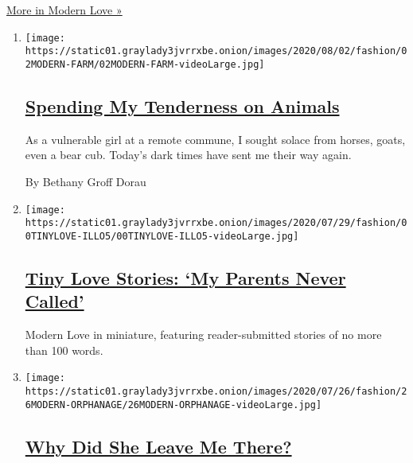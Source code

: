 \href{/column/modern-love}{More in Modern Love »}

\begin{enumerate}
\def\labelenumi{\arabic{enumi}.}
\item
  \texttt{[image: https://static01.graylady3jvrrxbe.onion/images/2020/08/02/fashion/02MODERN-FARM/02MODERN-FARM-videoLarge.jpg]}

  \hypertarget{spending-my-tenderness-on-animals}{%
  \subsection{\texorpdfstring{\href{/2020/07/31/style/modern-love-spending-tenderness-on-animals.html}{Spending
  My Tenderness on
  Animals}}{Spending My Tenderness on Animals}}\label{spending-my-tenderness-on-animals}}

  As a vulnerable girl at a remote commune, I sought solace from horses,
  goats, even a bear cub. Today's dark times have sent me their way
  again.

  By Bethany Groff Dorau
\item
  \texttt{[image: https://static01.graylady3jvrrxbe.onion/images/2020/07/29/fashion/00TINYLOVE-ILLO5/00TINYLOVE-ILLO5-videoLarge.jpg]}

  \hypertarget{tiny-love-stories-my-parents-never-called}{%
  \subsection{\texorpdfstring{\href{/2020/07/28/style/tiny-modern-love-stories-coronavirus-my-parents-never-called.html}{Tiny
  Love Stories: `My Parents Never
  Called'}}{Tiny Love Stories: `My Parents Never Called'}}\label{tiny-love-stories-my-parents-never-called}}

  Modern Love in miniature, featuring reader-submitted stories of no
  more than 100 words.
\item
  \texttt{[image: https://static01.graylady3jvrrxbe.onion/images/2020/07/26/fashion/26MODERN-ORPHANAGE/26MODERN-ORPHANAGE-videoLarge.jpg]}

  \hypertarget{why-did-she-leave-me-there}{%
  \subsection{\texorpdfstring{\href{/2020/07/24/style/modern-love-adoption-vietnam-why-did-she-leave-me-there.html}{Why
  Did She Leave Me
  There?}}{Why Did She Leave Me There?}}\label{why-did-she-leave-me-there}}


\end{enumerate}
